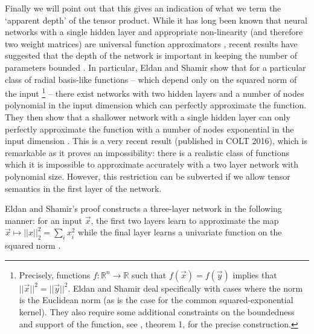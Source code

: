 Finally we will point out that this gives an indication of what we term the `apparent depth' of the
tensor product. While it has long been known that neural networks with a single hidden layer and
appropriate non-linearity (and therefore two weight matrices)
 are universal function approximators \autocite{Hornik1989}, recent results
have suggested that the depth of the network is important in keeping the number of parameters
bounded \autocite{Eldan2016, Telgarsky2016}. In particular, Eldan and Shamir show that for a
particular class of radial basis-like functions -- which depend only on the squared norm of the 
input
\footnote{Precisely, functions \(f : \mathbb{R}^n \to \mathbb{R}\) such that
\(f(\vec{x}) = f(\vec{y})\) implies that \(||\vec{x}||^2 = ||\vec{y}||^2\). Eldan and Shamir
deal specifically with cases where the norm is the Euclidean norm (as is the case for the
common squared-exponential kernel). They also
require some additional constraints on the boundedness and support of the function, see
\autocite{Eldan2016}, theorem 1, for the precise construction.} --
there exist networks with two hidden layers and a number of nodes polynomial in the input dimension
which can perfectly approximate the function. They then show that a shallower network with a single
hidden layer can only perfectly approximate the function with a number of nodes exponential in the
input dimension \autocite{Eldan2016}. This is a very recent result (published in COLT 2016), which
is remarkable as it proves an impossibility: there is a realistic class of functions which it is
impossible to approximate accurately with a two layer network with polynomial size. However,
this restriction can be subverted if we allow tensor semantics in the first layer of the network.

Eldan and Shamir's proof constructs a three-layer network in the following manner:
for an input \(\vec{x}\), the first two layers learn to approximate the map 
\(\vec{x}\mapsto ||x||^2_2 = \sum_i x_i^2\) while the final layer learns a univariate function on the
squared norm \autocite{Eldan2016}.

